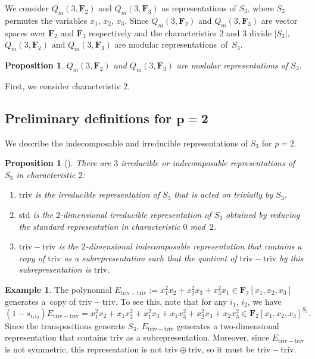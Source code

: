 \documentclass[pdftex]{sigma}
\newtheorem{Proposition}[Theorem]{Proposition}
\theoremstyle{definition}
\newtheorem{Example}[Theorem]{Example}
\numberwithin{equation}{section}
\newcommand{\triv}{\mathrm{triv}}
\newcommand{\std}{\mathrm{std}}
\newcommand{\trtr}{\mathrm{triv-triv}}
\begin{document}
We consider $Q_m(3, \mathbf{F}_{2})$ and $Q_m(3, \mathbf{F}_{3})$ as representations of $S_3$, where $S_3$ permutes the variables $x_1$, $x_2$, $x_3$. Since $Q_m(3, \mathbf{F}_{2})$ and $Q_m(3, \mathbf{F}_{3})$ are vector spaces over $\mathbf{F}_2$ and $\mathbf{F}_3$ respectively and the characteristics $2$ and $3$ divide $|S_3|$, $Q_m(3, \mathbf{F}_{2})$ and $Q_m(3, \mathbf{F}_{3})$ are modular representations~of~$S_3$.

\begin{Proposition}
 $Q_m(3, \mathbf{F}_{2})$ and $Q_m(3, \mathbf{F}_{3})$ are modular representations of $S_3$.
\end{Proposition}

First, we consider characteristic $2$.

\subsection[Preliminary definitions for p=2]{Preliminary definitions for $\boldsymbol{p=2}$}

We describe the indecomposable and irreducible representations of $S_3$ for $p=2$.

\begin{Proposition}[\cite{Alperin_1986}]\label{prop:p2indecomp}
 There are $3$ irreducible or indecomposable representations of $S_{3}$ in characteristic $2$:
 \begin{enumerate}\itemsep=0pt
 \item[$1$.] $\triv$ is the irreducible representation of $S_3$ that is acted on trivially by $S_{3}$.
 \item[$2$.] $\std$ is the $2$-dimensional irreducible representation of $S_3$ obtained by reducing the standard representation in characteristic $0$ mod~$2$.
 \item[$3$.] $\trtr$ is the $2$-dimensional indecomposable representation that contains a copy of $\triv$ as a subrepresentation such that the quotient of $\trtr$ by this subrepresentation is $\triv$.
 \end{enumerate}
\end{Proposition}

\begin{Example}\label{eg:p2reps}
 The polynomial $E_{\trtr}:=x_1^2x_2+x_2^2x_3+x_3^2x_1\in\mathbf{F}_2[x_1,x_2,x_3]$ generates a~copy of $\trtr$. To see this, note that for any $i_1$, $i_2$, we have
 \[(1-s_{i_1i_2})E_\trtr=x_1^2x_2+x_1x_2^2+x_1^2x_3+x_1x_3^2+x_2^2x_3+x_2x_3^2\in\mathbf{F}_2[x_1,x_2,x_3]^{S_3}.\]
 Since the transpositions generate $S_3$, $E_\trtr$ generates a two-dimensional representation that contains $\triv$ as a subrepresentation. Moreover, since $E_\trtr$ is not symmetric, this representation is not $\triv\oplus\triv$, so it must be $\trtr$.
\end{Example}
\end{document}
